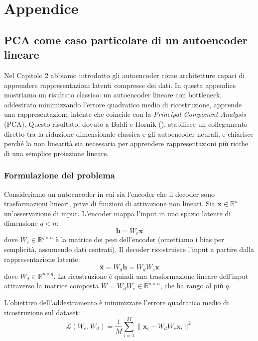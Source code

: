 \section{Appendice}

\subsection{PCA come caso particolare di un autoencoder lineare}
\label{app:pca}

Nel Capitolo 2 abbiamo introdotto gli autoencoder come architetture capaci di apprendere rappresentazioni latenti compresse dei dati. In questa appendice mostriamo un risultato classico: un autoencoder lineare con bottleneck, addestrato minimizzando l'errore quadratico medio di ricostruzione, apprende una rappresentazione latente che coincide con la \textit{Principal Component Analysis} (PCA). Questo risultato, dovuto a Baldi e Hornik (\cite{baldi1989neural}), stabilisce un collegamento diretto tra la riduzione dimensionale classica e gli autoencoder neurali, e chiarisce perché la non linearità sia necessaria per apprendere rappresentazioni più ricche di una semplice proiezione lineare.

\subsubsection{Formulazione del problema}

Consideriamo un autoencoder in cui sia l'encoder che il decoder sono trasformazioni lineari, prive di funzioni di attivazione non lineari. Sia $\mathbf{x} \in \mathbb{R}^n$ un'osservazione di input. L'encoder mappa l'input in uno spazio latente di dimensione $q < n$:
\begin{equation}
    \mathbf{h} = W_e \mathbf{x}
\end{equation}
dove $W_e \in \mathbb{R}^{q \times n}$ è la matrice dei pesi dell'encoder (omettiamo i bias per semplicità, assumendo dati centrati). Il decoder ricostruisce l'input a partire dalla rappresentazione latente:
\begin{equation}
    \hat{\mathbf{x}} = W_d \mathbf{h} = W_d W_e \mathbf{x}
\end{equation}
dove $W_d \in \mathbb{R}^{n \times q}$. La ricostruzione è quindi una trasformazione lineare dell'input attraverso la matrice composta $W = W_d W_e \in \mathbb{R}^{n \times n}$, che ha rango al più $q$.

L'obiettivo dell'addestramento è minimizzare l'errore quadratico medio di ricostruzione sul dataset:
\begin{equation}
    \mathcal{L}(W_e, W_d) = \frac{1}{M} \sum_{i=1}^{M} \| \mathbf{x}_i - W_d W_e \mathbf{x}_i \|^2
    \label{eq:pca_loss}
\end{equation}


